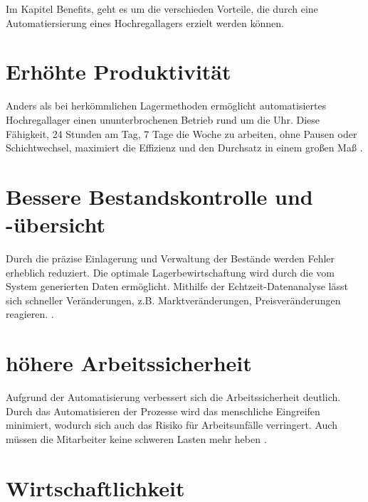 Im Kapitel Benefits, geht es um die verschieden Vorteile, die durch eine Automatiersierung eines Hochregallagers erzielt werden können.

	\section{Erhöhte Produktivität}
	Anders als bei herkömmlichen Lagermethoden ermöglicht automatisiertes Hochregallager einen ununterbrochenen Betrieb rund um die Uhr.
	Diese Fähigkeit, 24 Stunden am Tag, 7 Tage die Woche zu arbeiten, ohne Pausen oder Schichtwechsel, maximiert die Effizienz und den Durchsatz in einem großen Maß \autocite{ludwiniak_automatisches_2023}.
	\section{Bessere Bestandskontrolle und -übersicht}
	Durch die präzise Einlagerung und Verwaltung der Bestände werden Fehler erheblich reduziert. Die optimale Lagerbewirtschaftung wird durch die vom System generierten Daten ermöglicht. Mithilfe der Echtzeit-Datenanalyse lässt sich schneller Veränderungen, z.B. Marktveränderungen, Preisveränderungen reagieren.  \autocite{aiut_logistics_2024}.
	\section{höhere Arbeitssicherheit}
	Aufgrund der Automatisierung verbessert sich die Arbeitssicherheit deutlich. Durch das Automatisieren der Prozesse wird das menschliche Eingreifen minimiert, wodurch sich auch das Risiko für Arbeitsunfälle verringert. Auch müssen die Mitarbeiter keine schweren Lasten mehr heben \autocite{ohra_automatisierte_2024}.
	\section{Wirtschaftlichkeit}

